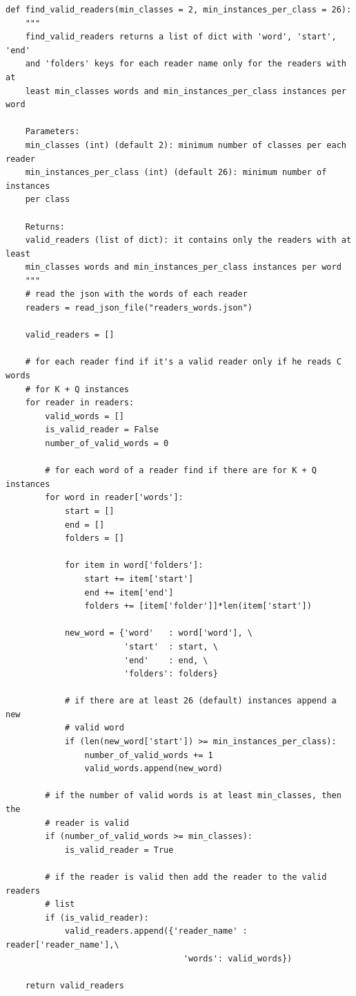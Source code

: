 \documentclass[12pt,a4paper,titlepage]{article}
\begin{document}
\begin{lstlisting}[language=iPython,firstnumber=10, caption=Funzione \texttt{find\_valid\_readers}, label=find_valid_readers,captionpos=b]
def find_valid_readers(min_classes = 2, min_instances_per_class = 26):
    """
    find_valid_readers returns a list of dict with 'word', 'start', 'end'
    and 'folders' keys for each reader name only for the readers with at
    least min_classes words and min_instances_per_class instances per word

    Parameters:
    min_classes (int) (default 2): minimum number of classes per each reader
    min_instances_per_class (int) (default 26): minimum number of instances 
    per class

    Returns:
    valid_readers (list of dict): it contains only the readers with at least
    min_classes words and min_instances_per_class instances per word
    """
    # read the json with the words of each reader
    readers = read_json_file("readers_words.json")

    valid_readers = []

    # for each reader find if it's a valid reader only if he reads C words
    # for K + Q instances
    for reader in readers:    
        valid_words = []
        is_valid_reader = False
        number_of_valid_words = 0

        # for each word of a reader find if there are for K + Q instances
        for word in reader['words']:
            start = []
            end = []
            folders = []

            for item in word['folders']:
                start += item['start']
                end += item['end']
                folders += [item['folder']]*len(item['start'])

            new_word = {'word'   : word['word'], \
                        'start'  : start, \
                        'end'    : end, \
                        'folders': folders}

            # if there are at least 26 (default) instances append a new 
            # valid word
            if (len(new_word['start']) >= min_instances_per_class):
                number_of_valid_words += 1
                valid_words.append(new_word)

        # if the number of valid words is at least min_classes, then the 
        # reader is valid
        if (number_of_valid_words >= min_classes):
            is_valid_reader = True

        # if the reader is valid then add the reader to the valid readers
        # list
        if (is_valid_reader):
            valid_readers.append({'reader_name' : reader['reader_name'],\
                                    'words': valid_words})

    return valid_readers
\end{lstlisting}
\end{document}
